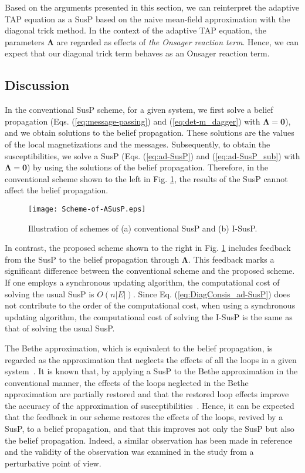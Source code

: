 \documentclass[%
 reprint,
 amsmath,amssymb,
 aps, 
 pre,
 showkeys
]{revtex4-1}
\begin{document}
Based on the arguments presented in this section, we can reinterpret the adaptive TAP equation as a SusP based on the naive mean-field approximation with the diagonal trick method. 
In the context of the adaptive TAP equation, the parameters $\bm{\Lambda}$ are regarded as effects of \textit{the Onsager reaction term}. 
Hence, we can expect that our diagonal trick term behaves as an Onsager reaction term.

\subsection{Discussion}

In the conventional SusP scheme, for a given system, we first solve a belief propagation (Eqs. (\ref{eq:message-passing}) and (\ref{eq:det-m_dagger}) with $\bm{\Lambda} = \bm{0}$), 
and we obtain solutions to the belief propagation. These solutions are the values of the local magnetizations and the messages.  
Subsequently, to obtain the susceptibilities, we solve a SusP (Eqs. (\ref{eq:ad-SusP}) and (\ref{eq:ad-SusP_sub}) with $\bm{\Lambda} = \bm{0}$) by using the solutions of the belief propagation. 
Therefore, in the conventional scheme shown to the left in Fig. \ref{fig:Scheme}, the results of the SusP cannot affect the belief propagation.
\begin{figure}[hbt]
\begin{center}
\texttt{[image: Scheme-of-ASusP.eps]}
\end{center}
\caption{Illustration of schemes of (a) conventional SusP and (b) I-SusP.}
\label{fig:Scheme}
\end{figure}
In contrast, the proposed scheme shown to the right in Fig. \ref{fig:Scheme} includes feedback from the SusP to the belief propagation through $\bm{\Lambda}$. 
This feedback marks a significant difference between the conventional scheme and the proposed scheme. 
If one employs a synchronous updating algorithm, the computational cost of solving the usual SusP is $O(n |E|)$. 
Since Eq. (\ref{eq:DiagConsis_ad-SusP}) does not contribute to the order of the computational cost, when using a synchronous updating algorithm, 
the computational cost of solving the I-SusP is the same as that of solving the usual SusP.


The Bethe approximation, which is equivalent to the belief propagation, 
is regarded as the approximation that neglects the effects of all the loops in a given system~\cite{Yasuda&Tanaka2006}. 
It is known that, by applying a SusP to the Bethe approximation in the conventional manner, the effects of the loops neglected in the Bethe approximation are partially restored 
and that the restored loop effects improve the accuracy of the approximation of susceptibilities~\cite{Yasuda&Tanaka2007}. 
Hence, it can be expected that the feedback in our scheme restores the effects of the loops, 
revived by a SusP, to a belief propagation, and that this improves not only the SusP but also the belief propagation. 
Indeed, a similar observation has been made in reference \cite{T.Tanaka1998} and the validity of the observation was examined in the study from a perturbative point of view.
\end{document}
